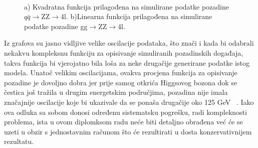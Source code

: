 \documentclass[12pt,a4paper,oneside]{article}
\begin{document}
\begin{linenumbers}
\begin{figure}[H]
\begin{subfigure}[b]{0.9\textwidth}
				\caption{}
				\label{fig:bckg-gg}
			\end{subfigure}
			~ %
			\caption{a) Kvadratna funkcija prilagođena na simulirane podatke pozadine $q\bar{q}$$\rightarrow$ZZ$\rightarrow$4l.	b)Linearna funkcija prilagođena na simulirane podatke pozadine gg$\rightarrow$ZZ$\rightarrow$4l.}\label{fig:grafovi-2}
		\end{figure}
		
		Iz grafova su jasno vidljive velike oscilacije podataka, što znači i kada bi odabrali nekakvu kompleksnu funkciju za opisivanje simuliranih pozadinskih događaja, takva funkcija bi vjerojatno bila loša za neke drugačije generirane podatke istog modela.
		Unatoč velikim oscilacijama, ovakva procjena funkcija za opisivanje pozadine je dovoljno dobra jer prije samog otkrića Higgsovog bozona dok se čestica još tražila u drugim energetskim područjima, pozadina nije imala značajnije oscilacije koje bi ukazivale da se ponaša drugačije oko 125 GeV ~\cite{royal-sm8, royal-sm9}. Iako ova odluka sa sobom donosi određenu sistematsku pogrešku, radi kompleknosti problema, ista u ovom diplomksom radu neće biti detaljno obrađena već će se uzeti u obzir s jednostavnim računom što će rezultirati u dosta konzervativnijem rezultatu.  
		

\end{linenumbers}
\end{document}
